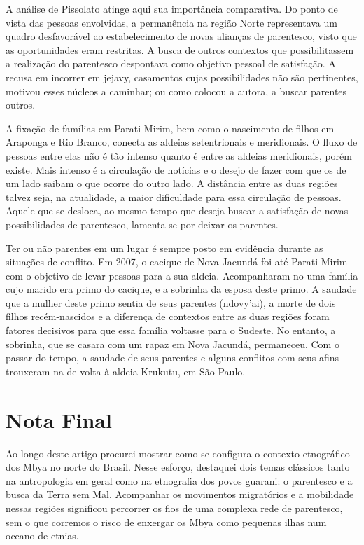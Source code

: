 {{A análise de Pissolato atinge aqui sua importância comparativa. Do ponto
de vista das pessoas envolvidas, a permanência na região Norte
representava um quadro desfavorável ao estabelecimento de novas
alianças de parentesco, visto que as oportunidades eram restritas. A
busca de outros contextos que possibilitassem a realização do
parentesco despontava como objetivo pessoal de satisfação. A recusa em
incorrer em jejavy, casamentos cujas possibilidades não são
pertinentes, motivou esses núcleos a caminhar; ou como colocou a
autora, a buscar parentes outros. 

A fixação de famílias em Parati-Mirim, bem como o nascimento de filhos
em Araponga e Rio Branco, conecta as aldeias setentrionais e
meridionais. O fluxo de pessoas entre elas não é tão intenso quanto é
entre as aldeias meridionais, porém existe. Mais intenso é a circulação
de notícias e o desejo de fazer com que os de um lado saibam o que
ocorre do outro lado. A distância entre as duas regiões talvez seja, na
atualidade, a maior dificuldade para essa circulação de pessoas. Aquele
que se desloca, ao mesmo tempo que deseja buscar a satisfação de novas
possibilidades de parentesco, lamenta-se por deixar os parentes. 

Ter ou não parentes em um lugar é sempre posto em evidência durante as
situações de conflito. Em 2007, o cacique de Nova Jacundá foi até
Parati-Mirim com o objetivo de levar pessoas para a sua aldeia.
Acompanharam-no uma família cujo marido era primo do cacique, e a
sobrinha da esposa deste primo. A saudade que a mulher deste primo
sentia de seus parentes (ndovy’ai), a morte de dois filhos
recém-nascidos e a diferença de contextos entre as duas regiões foram
fatores decisivos para que essa família voltasse para o Sudeste. No
entanto, a sobrinha, que se casara com um rapaz em Nova Jacundá,
permaneceu. Com o passar do tempo, a saudade de seus parentes e alguns
conflitos com seus afins trouxeram-na de volta à aldeia Krukutu, em São
Paulo.

\section{Nota Final}

Ao longo deste artigo procurei mostrar como se configura o contexto
etnográfico dos Mbya no norte do Brasil. Nesse esforço, destaquei dois
temas clássicos tanto na antropologia em geral como na etnografia dos
povos guarani: o parentesco e a busca da Terra sem Mal. Acompanhar os
movimentos migratórios e a mobilidade nessas regiões significou
percorrer os fios de uma complexa rede de parentesco, sem o que
corremos o risco de enxergar os Mbya como pequenas ilhas num oceano de
etnias.

}}
